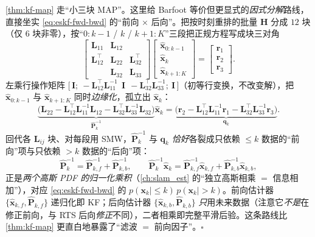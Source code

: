 \begin{derivation}\label{der:factor-batch}
\cref{thm:kf-map} 走“小三块 MAP”。这里给 Barfoot\cite{barfoot2024state} 等价但更显式的\emph{因式分解}路线，直接坐实 \cref{eq:eskf-fwd-bwd} 的“前向 $\times$ 后向”。把按时刻重排的批量 $\mathbf{H}$ 分成 $12$ 块（仅 $6$ 块非零），按“$0\!:\!k\!-\!1$ / $k$ / $k\!+\!1\!:\!K$”三段把正规方程写成块三对角
\[
  \begin{bmatrix}\mathbf{L}_{11}&\mathbf{L}_{12}&\\ \mathbf{L}_{12}^\top&\mathbf{L}_{22}&\mathbf{L}_{32}^\top\\ &\mathbf{L}_{32}&\mathbf{L}_{33}\end{bmatrix}
  \begin{bmatrix}\hat{\mathbf{x}}_{0:k-1}\\\hat{\mathbf{x}}_k\\\hat{\mathbf{x}}_{k+1:K}\end{bmatrix}
  =\begin{bmatrix}\mathbf{r}_1\\\mathbf{r}_2\\\mathbf{r}_3\end{bmatrix}.
\]
左乘行操作矩阵 $\big[\,\mathbf{I};\ -\mathbf{L}_{12}^\top\mathbf{L}_{11}^{-1}\ \ \mathbf{I}\ \ -\mathbf{L}_{32}^\top\mathbf{L}_{33}^{-1};\ \mathbf{I}\,\big]$（初等行变换，不改变解），把 $\hat{\mathbf{x}}_{0:k-1}$ 与 $\hat{\mathbf{x}}_{k+1:K}$ 同时\emph{边缘化}，孤立出 $\hat{\mathbf{x}}_k$：
\[
  \underbrace{\big(\mathbf{L}_{22}-\mathbf{L}_{12}^\top\mathbf{L}_{11}^{-1}\mathbf{L}_{12}-\mathbf{L}_{32}^\top\mathbf{L}_{33}^{-1}\mathbf{L}_{32}\big)}_{\hat{\mathbf{P}}_k^{-1}}\hat{\mathbf{x}}_k
  =\underbrace{\big(\mathbf{r}_2-\mathbf{L}_{12}^\top\mathbf{L}_{11}^{-1}\mathbf{r}_1-\mathbf{L}_{32}^\top\mathbf{L}_{33}^{-1}\mathbf{r}_3\big)}_{\mathbf{q}_k}.
\]
回代各 $\mathbf{L}_{ij}$ 块、对每段用 SMW，$\hat{\mathbf{P}}_k^{-1}$ 与 $\mathbf{q}_k$ \emph{恰好}各裂成只依赖 $\le k$ 数据的“前向”项与只依赖 $>k$ 数据的“后向”项：
\[
  \hat{\mathbf{P}}_k^{-1}=\hat{\mathbf{P}}_{k,f}^{-1}+\hat{\mathbf{P}}_{k,b}^{-1},\qquad
  \hat{\mathbf{P}}_k^{-1}\hat{\mathbf{x}}_k=\hat{\mathbf{P}}_{k,f}^{-1}\hat{\mathbf{x}}_{k,f}+\hat{\mathbf{P}}_{k,b}^{-1}\hat{\mathbf{x}}_{k,b},
\]
正是\emph{两个高斯 PDF 的归一化乘积}（\cref{ch:slam_est} 的“独立高斯相乘 $=$ 信息相加”），对应 \cref{eq:eskf-fwd-bwd} 的 $p(\mathbf{x}_k\mid\le k)\,p(\mathbf{x}_k\mid>k)$。前向估计器 $\{\hat{\mathbf{x}}_{k,f},\hat{\mathbf{P}}_{k,f}\}$ 递归化即 KF；后向估计器 $\{\hat{\mathbf{x}}_{k,b},\hat{\mathbf{P}}_{k,b}\}$ \emph{只}用未来数据（注意它\emph{不是}在修正前向，与 RTS 后向\emph{修正}不同），二者相乘即完整平滑后验。这条路线比 \cref{thm:kf-map} 更直白地暴露了“滤波 $=$ 前向因子”。\hfill$\square$
\end{derivation}

